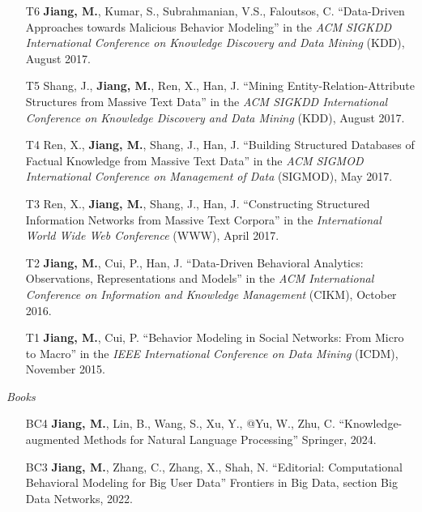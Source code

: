 \documentclass[10pt]{article}
\newenvironment{myindentpar}[1]%
{\begin{list}{}%
         {\setlength{\leftmargin}{#1}}%
         \item[]%
}
{\end{list}}
\newcounter{list}
\begin{document}
\begin{myindentpar}{0.00cm}
\begin{enumerate}[leftmargin=.5cm]
\item[T6] \textbf{Jiang, M.}, Kumar, S., Subrahmanian, V.S., Faloutsos, C. ``Data-Driven Approaches towards Malicious Behavior Modeling'' in the \textit{ACM SIGKDD International Conference on Knowledge Discovery and Data Mining} (KDD), August 2017.

\item[T5] Shang, J., \textbf{Jiang, M.}, Ren, X., Han, J. ``Mining Entity-Relation-Attribute Structures from Massive Text Data'' in the \textit{ACM SIGKDD International Conference on Knowledge Discovery and Data Mining} (KDD), August 2017.

\item[T4] Ren, X., \textbf{Jiang, M.}, Shang, J., Han, J. ``Building Structured Databases of Factual Knowledge from Massive Text Data'' in the \textit{ACM SIGMOD International Conference on Management of Data} (SIGMOD), May 2017.
		
\item[T3] Ren, X., \textbf{Jiang, M.}, Shang, J., Han, J. ``Constructing Structured Information Networks from Massive Text Corpora'' in the \textit{International World Wide Web Conference}  (WWW), April 2017.

\item[T2] \textbf{Jiang, M.}, Cui, P., Han, J. ``Data-Driven Behavioral Analytics: Observations, Representations and Models'' in the \textit{ACM International Conference on Information and Knowledge Management} (CIKM), October 2016.
		
\item[T1] \textbf{Jiang, M.}, Cui, P. ``Behavior Modeling in Social Networks: From Micro to Macro'' in the \textit{IEEE International Conference on Data Mining} (ICDM), November 2015.

\end{enumerate}

\hspace{-0.25cm}\textit{Books}

\begin{enumerate}[leftmargin=.5cm]

\item[BC4] \textbf{Jiang, M.}, Lin, B., Wang, S., Xu, Y., @Yu, W., Zhu, C. ``Knowledge-augmented Methods for Natural Language Processing'' Springer, 2024.

\item[BC3] \textbf{Jiang, M.}, Zhang, C., Zhang, X., Shah, N. ``Editorial: Computational Behavioral Modeling for Big User Data'' Frontiers in Big Data, section Big Data Networks, 2022.
		

\end{enumerate}
\end{myindentpar}
\end{document}
